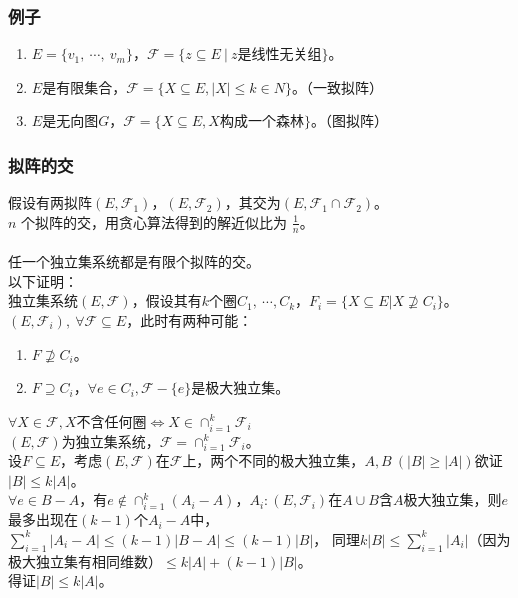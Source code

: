 \subsubsection{例子}
\begin{enumerate}
    \item $E = \{v_1, \ \cdots, \ v_m\}$，$\mathcal{F} = \{z \subseteq E \ | \ z$是线性无关组$\}$。
    \item $E$是有限集合，$\mathcal{F} = \{X \subseteq E, |X| \le k \in N\}$。（一致拟阵）
    \item $E$是无向图$G$，$\mathcal{F} = \{X \subseteq E, X$构成一个森林$\}$。（图拟阵）
\end{enumerate}

\subsubsection{拟阵的交}
假设有两拟阵$(E, \mathcal{F}_1)$，$(E, \mathcal{F}_2)$，其交为$(E, \mathcal{F}_1 \cap \mathcal{F}_2)$。 \\
$n$ 个拟阵的交，用贪心算法得到的解近似比为 $\frac{1}{n}$。 \\~\\
任一个独立集系统都是有限个拟阵的交。 \\
以下证明： \\
独立集系统$(E, \mathcal{F})$，假设其有$k$个圈$C_1, \ \cdots, C_k$，$F_i = \{X \subseteq E | X \nsupseteq C_i\}$。 \\
$(E, \mathcal{F}_i), \ \forall \mathcal{F} \subseteq E$，此时有两种可能：
\begin{enumerate}
    \item $F \nsupseteq C_i$。
    \item $F \supseteq C_i$，$\forall e \in C_i, \mathcal{F} - \{e\}$是极大独立集。
\end{enumerate}
$\forall X \in \mathcal{F}, X$不含任何圈$\iff X \in \cap^{k}_{i = 1}\mathcal{F}_i$ \\
$(E, \mathcal{F})$为独立集系统，$\mathcal{F} = \cap^{k}_{i = 1}\mathcal{F}_i$。 \\
设$F \subseteq E$，考虑$(E, \mathcal{F})$在$\mathcal{F}$上，两个不同的极大独立集，$A, B \ (|B| \ge |A|)$欲证$|B| \le k|A|$。 \\
$\forall e \in B - A$，有$e \notin \cap^{k}_{i = 1} (A_i - A)$，$A_i: (E, \mathcal{F}_i)$在$A \cup B$含$A$极大独立集，则$e$最多出现在$(k - 1)$个$A_i - A$中，$\sum^{k}_{i = 1}|A_i - A| \le (k - 1)|B - A| \le (k - 1)|B|$，
同理$k|B| \le \sum^{k}_{i = 1}|A_i| $（因为极大独立集有相同维数）$\le k|A| + (k - 1)|B|$。 \\
得证$|B| \le k|A|$。


